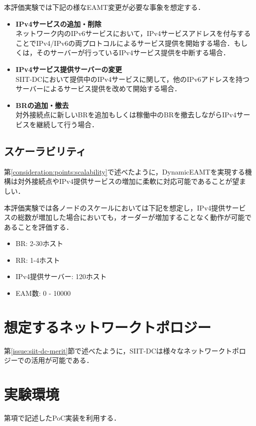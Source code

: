 本評価実験では下記の様なEAMT変更が必要な事象を想定する．

\begin{itemize}
    \item \textbf{IPv4サービスの追加・削除} \\
    ネットワーク内のIPv6サービスにおいて，IPv4サービスアドレスを付与することでIPv4/IPv6の両プロトコルによるサービス提供を開始する場合．もしくは，そのサーバーが行っているIPv4サービス提供を中断する場合．
    \item \textbf{IPv4サービス提供サーバーの変更} \\
    SIIT-DCにおいて提供中のIPv4サービスに関して，他のIPv6アドレスを持つサーバーによるサービス提供を改めて開始する場合．
    \item \textbf{BRの追加・撤去} \\ 
    対外接続点に新しいBRを追加もしくは稼働中のBRを撤去しながらIPv4サービスを継続して行う場合．
\end{itemize}


\subsection{スケーラビリティ}
第\ref{consideration:points:scalability}で述べたように，DynamicEAMTを実現する機構は対外接続点やIPv4提供サービスの増加に柔軟に対応可能であることが望ましい．

本評価実験では各ノードのスケールにおいては下記を想定し，IPv4提供サービスの総数が増加した場合においても，オーダーが増加することなく動作が可能であることを評価する．

\begin{itemize}
    \item BR: 2-30ホスト 
    \item RR: 1-4ホスト 
    \item IPv4提供サーバー: 120ホスト
    \item EAM数: 0 - 10000
\end{itemize}




\section{想定するネットワークトポロジー}
第\ref{issue:siit-dc-merit}節で述べたように，SIIT-DCは様々なネットワークトポロジーでの活用が可能である．


\section{実験環境}
第\label{implementation:poc}項で記述したPoC実装を利用する．



